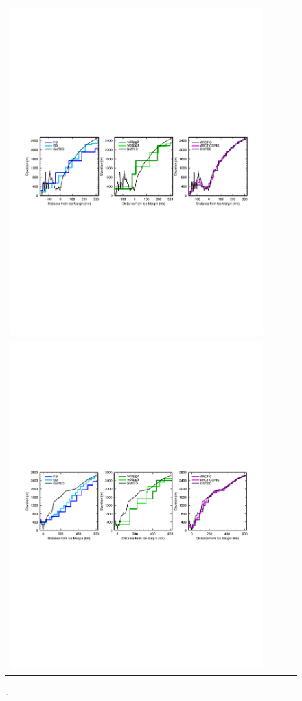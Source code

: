 \documentclass[draft]{agujournal2019}
\begin{document}
\begin{figure}[t]
\begin{center}
\begin{tabular}{cccc}
         \includegraphics[width=100mm]{figs/temp_ktransect.pdf} \\
         \includegraphics[width=100mm]{figs/temp_btransect.pdf} \\
\end{tabular}
\end{center}
\caption{.}
\label{fig:prect}
\end{figure}
\end{document}
